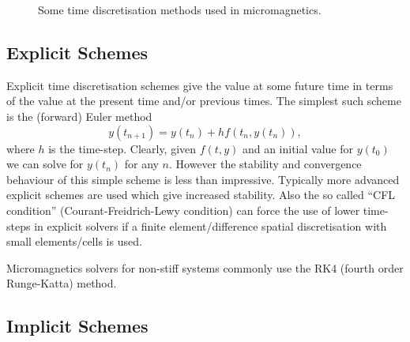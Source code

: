 \begin{figure}[h]
  \centering
  \caption{Some time discretisation methods  used in micromagnetics.}
  \label{fig:types-time-disc}
\end{figure}

\subsection{Explicit Schemes}
\label{sec:explicit-schemes}

Explicit time discretisation schemes give the value at some future time in terms of the value at the present time and/or previous times. The simplest such scheme is the (forward) Euler method
\begin{equation}
  \label{eq:44}
  y(t_{n+1}) = y(t_n) + h f(t_n,y(t_n)),
\end{equation}
where $h$ is the time-step. Clearly, given $f(t,y)$ and an initial value for $y(t_0)$ we can solve for $y(t_n)$ for any $n$. However the stability and convergence behaviour of this simple scheme is less than impressive. Typically more advanced explicit schemes are used which give increased stability.\cite{Atkinson2009} Also the so called ``CFL condition'' (Courant-Freidrich-Lewy condition) can force the use of lower time-steps in explicit solvers if a finite element/difference spatial discretisation with small elements/cells is used.

Micromagnetics solvers for non-stiff systems commonly use the RK4 (fourth order Runge-Katta) method.\cite{Suess2002}


\subsection{Implicit Schemes}
\label{sec:implicit-schemes}

